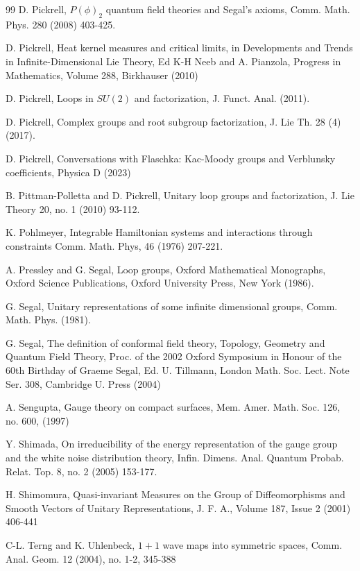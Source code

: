 \documentclass{amsart}
\theoremstyle{conjecture}
\theoremstyle{definition}
\theoremstyle{question}
\theoremstyle{questions}
\theoremstyle{remark}
\theoremstyle{remarks}
\theoremstyle{example}
\numberwithin{equation}{section}
\begin{document}
\begin{thebibliography}{99}
 D. Pickrell, $P(\phi)_2$ quantum field theories and Segal's axioms,
 Comm. Math. Phys. 280 (2008) 403-425.

 D. Pickrell, Heat kernel measures and critical limits, in Developments and
Trends in Infinite-Dimensional Lie Theory, Ed K-H Neeb and A. Pianzola,
Progress in Mathematics, Volume 288, Birkhauser (2010)

D. Pickrell, Loops in $SU(2)$ and factorization, J. Funct. Anal. (2011).

 D. Pickrell, Complex groups and root subgroup factorization, J. Lie Th. 28 (4) (2017).

D. Pickrell, Conversations with Flaschka: Kac-Moody groups and Verblunsky coefficients,
Physica D  (2023)

 B. Pittman-Polletta and D. Pickrell, Unitary loop groups and factorization,
J. Lie Theory 20, no. 1 (2010) 93-112.


K. Pohlmeyer, Integrable Hamiltonian systems and interactions through
constraints Comm. Math. Phys, 46 (1976) 207-221.

 A. Pressley and G. Segal, Loop groups, Oxford Mathematical Monographs,
Oxford Science Publications, Oxford University Press, New York
(1986).

 G. Segal, Unitary representations of
some infinite dimensional groups, Comm.  Math.  Phys.
(1981).

 G. Segal, The definition of conformal field theory,
Topology, Geometry and Quantum Field Theory, Proc. of the 2002 Oxford
Symposium in Honour of the 60th Birthday of Graeme Segal, Ed. U. Tillmann,
London Math. Soc. Lect. Note Ser. 308, Cambridge U. Press (2004)

 A. Sengupta, Gauge theory on compact surfaces, Mem. Amer. Math. Soc. 126, no. 600, (1997)

 Y. Shimada, On irreducibility of the energy representation of the
gauge group and the white noise distribution theory,
Infin. Dimens. Anal. Quantum Probab. Relat. Top. 8, no. 2 (2005) 153-177.

H. Shimomura, Quasi-invariant Measures on the Group of Diffeomorphisms
and Smooth Vectors of Unitary Representations, J. F. A.,
Volume 187, Issue 2 (2001) 406-441

 C-L. Terng and K. Uhlenbeck, $ 1+1$ wave maps into symmetric spaces,
Comm. Anal. Geom. 12 (2004), no. 1-2, 345-388


\end{thebibliography}
\end{document}
